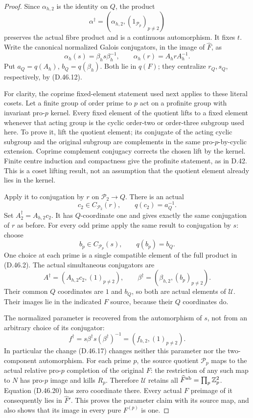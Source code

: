 \begin{proof}
Since \(\alpha_{h,2}\)
is the identity on \(Q\),
the product
\[
          \alpha^\dagger
              =(\alpha_{h,2},(1_{\mathcal P_p})_{p\ne2})
                                                               \tag{D.46.16}
\]
preserves the actual fibre
product and is a continuous
automorphism. It fixes \(t\).
Write the canonical normalized
Galois conjugators, in the
image of \(\widehat F\), as
\[
 \alpha_h(s)=\beta_hs\beta_h^{-1},\qquad
 \alpha_h(r)=A_hrA_h^{-1}.
\]
Put \(a_Q=q(A_h)\),
\(b_Q=q(\beta_h)\).
Both lie in \(q(F)\);
they centralize \(r_Q,s_Q\),
respectively, by (D.46.12).

For clarity, the coprime
fixed-element statement
used next applies to
these literal cosets.
Let a finite group of
order prime to \(p\)
act on a profinite
group with invariant
pro-\(p\) kernel.
Every fixed element of
the quotient lifts to
a fixed element whenever
that acting group is the
cyclic order-two or
order-three subgroup
used here. To prove it,
lift the quotient element;
its conjugate of the
acting cyclic subgroup
and the original subgroup
are complements in the
same pro-\(p\)-by-cyclic
extension. Coprime
complement conjugacy
corrects the chosen
lift by the kernel.
Finite centre induction
and compactness give the
profinite statement, as
in D.42. This is a
coset lifting result,
not an assumption that
the quotient element
already lies in the
kernel.

Apply it to conjugation
by \(r\) on
\(\mathcal P_2\to Q\).
There is an actual
\[
 c_2\in C_{\mathcal P_2}(r),
                  \qquad q(c_2)=a_Q^{-1}.                     \tag{D.46.17}
\]
Set \(A_2^\dagger=A_{h,2}c_2\).
It has \(Q\)-coordinate
one and gives exactly
the same conjugation
of \(r\) as before.
For every odd prime
apply the same result
to conjugation by \(s\):
choose
\[
 b_p\in C_{\mathcal P_p}(s),\qquad
                         q(b_p)=b_Q.                         \tag{D.46.18}
\]
One choice at each prime
is a single compatible
element of the full
product in (D.46.2).
The actual simultaneous
conjugators are
\[
 A^\dagger=(A_{h,2}c_2,(1)_{p\ne2}),\qquad
 \beta^\dagger=(\beta_{h,2},(b_p)_{p\ne2}).                    \tag{D.46.19}
\]
Their common \(Q\)
coordinates are \(1\)
and \(b_Q\), so both
are actual elements of
\(\mathcal U\). Their
images lie in the
indicated \(F\) source,
because their \(Q\)
coordinates do.

The normalized parameter
is recovered from the
automorphism of \(s\),
not from an arbitrary
choice of its conjugator:
\[
 f^\dagger=s\beta^\dagger s(\beta^\dagger)^{-1}
                         =(f_{h,2},(1)_{p\ne2}).              \tag{D.46.20}
\]
In particular the change
(D.46.17) changes neither
this parameter nor the
two-component automorphism.
For each prime \(p\),
the source quotient
\(\mathcal P_p\) maps
to the actual relative
pro-\(p\) completion of
the original \(F\):
the restriction of
any such map to \(N\)
has pro-\(p\) image
and kills \(R_p\).
Therefore \(\mathcal U\)
retains all
\(\widehat F^{\rm ab}
=\prod_p\mathbb Z_p^2\).
Equation (D.46.20) has
zero coordinate there.
Every actual \(F\)
preimage of it consequently
lies in \(\widehat F'\).
This proves the parameter
claim with its source
map, and also shows
that its image in
every pure \(F^{(p)}\)
is one.


\end{proof}
